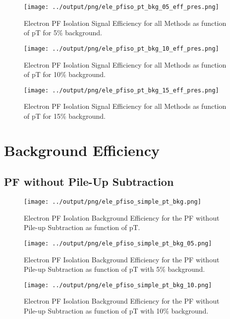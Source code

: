 \documentclass[11pt]{book}
\begin{document}
\begin{figure}[htb]
\centering
\texttt{[image: ../output/png/ele\_pfiso\_pt\_bkg\_05\_eff\_pres.png]}
\caption{Electron PF Isolation Signal Efficiency for all Methods as function of pT for 5\% background.}
\label{fig:ele_pfiso_pt_bkg_05_eff_pres}
\end{figure}

\begin{figure}[htb]
\centering
\texttt{[image: ../output/png/ele\_pfiso\_pt\_bkg\_10\_eff\_pres.png]}
\caption{Electron PF Isolation Signal Efficiency for all Methods as function of pT for 10\% background.}
\label{fig:ele_pfiso_pt_bkg_10_eff_pres}
\end{figure}

\begin{figure}[htb]
\centering
\texttt{[image: ../output/png/ele\_pfiso\_pt\_bkg\_15\_eff\_pres.png]}
\caption{Electron PF Isolation Signal Efficiency for all Methods as function of pT for 15\% background.}
\label{fig:ele_pfiso_pt_bkg_15_eff_pres}
\end{figure}
\clearpage

\chapter{Background Efficiency}
\section{PF without Pile-Up Subtraction}
\begin{figure}[htb]
\centering
\texttt{[image: ../output/png/ele\_pfiso\_simple\_pt\_bkg.png]}
\caption{Electron PF Isolation Background Efficiency for the PF without Pile-up Subtraction as function of pT.}
\label{fig:ele_pfiso_pt_bkg_simple}
\end{figure}

\begin{figure}[htb]
\centering
\texttt{[image: ../output/png/ele\_pfiso\_simple\_pt\_bkg\_05.png]}
\caption{Electron PF Isolation Background Efficiency for the PF without Pile-up Subtraction as function of pT with 5\% background.}
\label{fig:ele_pfiso_pt_bkg_simple_bkg_05}
\end{figure}

\begin{figure}[htb]
\centering
\texttt{[image: ../output/png/ele\_pfiso\_simple\_pt\_bkg\_10.png]}
\caption{Electron PF Isolation Background Efficiency for the PF without Pile-up Subtraction as function of pT with 10\% background.}
\label{fig:ele_pfiso_pt_bkg_simple_bkg_10}
\end{figure}
\end{document}

